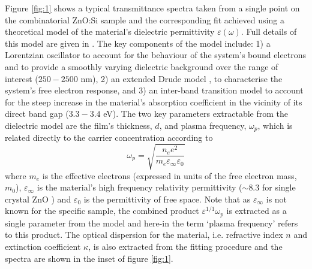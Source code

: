 \documentclass[final,5p,times]{elsarticle}
\begin{document}
Figure \ref{fig:1} shows a typical transmittance spectra taken from a single point on the combinatorial ZnO:Si sample and the corresponding fit achieved using a theoretical model of the material's dielectric permittivity $\varepsilon(\omega)$. Full details of this model are given in \cite{Treharne2012}. The key components of the model include: 1) a Lorentzian oscillator to account for the behaviour of the system's bound electrons and to provide a smoothly varying dielectric background over the range of interest ($250-2500$ nm), 2) an extended Drude model \cite{Mergel2002}, to characterise the system's free electron response, and 3) an inter-band transition model to account for the steep increase in the material's absorption coefficient in the vicinity of its direct band gap ($3.3 - 3.4$ eV). The two key parameters extractable from the dielectric model are the film's thickness, $d$, and plasma frequency, $\omega_{p}$, which is related directly to the carrier concentration according to
\begin{equation}
\label{eqn:1}
\omega_p = \sqrt{\frac{n_e e^2}{m_e\varepsilon_{\infty} \varepsilon_0}}
\end{equation}
where $m_e$ is the effective electrons (expressed in units of the free electron mass, $m_0$), $\varepsilon_{\infty}$ is the material's high frequency relativity permittivity  ($\sim 8.3$ for single crystal ZnO \citep{Ashkenov2003}) and $\varepsilon_0$ is the permittivity of free space. Note that as $\varepsilon_{\infty}$ is not known for the specific sample, the combined product $\varepsilon^{1/1}\omega_p$ is extracted as a single parameter from the model and here-in the term `plasma frequency' refers to this product. The optical dispersion for the material, i.e. refractive index $n$ and extinction coefficient $\kappa$, is also extracted from the fitting procedure and the spectra are shown in the inset of figure \ref{fig:1}.
\end{document}

